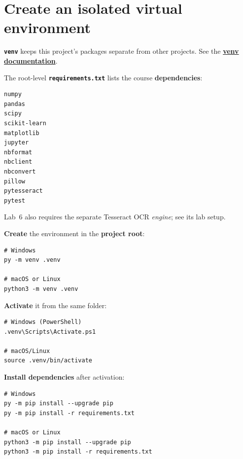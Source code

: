 \section{Create an isolated virtual environment}

\textbf{\texttt{venv}} keeps this project's packages separate from other projects. See the \href{https://docs.python.org/3/library/venv.html}{\textbf{venv documentation}}.

The root-level \textbf{\texttt{requirements.txt}} lists the course \textbf{dependencies}:

\begin{lstlisting}[style=mlterminal]
numpy
pandas
scipy
scikit-learn
matplotlib
jupyter
nbformat
nbclient
nbconvert
pillow
pytesseract
pytest
\end{lstlisting}

Lab~6 also requires the separate Tesseract OCR \emph{engine}; see its lab setup.

\textbf{Create} the environment in the \textbf{project root}:

\begin{lstlisting}[style=mlterminal]
# Windows
py -m venv .venv

# macOS or Linux
python3 -m venv .venv
\end{lstlisting}

\textbf{Activate} it from the same folder:

\begin{lstlisting}[style=mlterminal]
# Windows (PowerShell)
.venv\Scripts\Activate.ps1

# macOS/Linux
source .venv/bin/activate
\end{lstlisting}

\textbf{Install dependencies} after activation:

\begin{lstlisting}[style=mlterminal]
# Windows
py -m pip install --upgrade pip
py -m pip install -r requirements.txt

# macOS or Linux
python3 -m pip install --upgrade pip
python3 -m pip install -r requirements.txt
\end{lstlisting}

